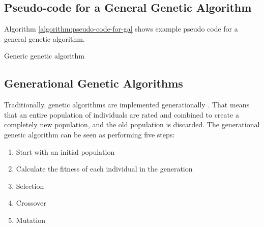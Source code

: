 \subsection{Pseudo-code for a General Genetic Algorithm}

Algorithm \vref{algorithm:pseudo-code-for-ga} shows example pseudo code for a general genetic algorithm.

\begin{algorithm}[H]
\SetAlgoLined
\DontPrintSemicolon
{}
\caption{Generic genetic algorithm}
\label{algorithm:pseudo-code-for-ga}
\end{algorithm}


\subsection{Generational Genetic Algorithms}

Traditionally, genetic algorithms are implemented generationally . That means that an entire population of individuals are rated and combined to create a completely new population, and the old population is discarded. The generational genetic algorithm can be seen as performing five steps:


\begin{enumerate}
    \item Start with an initial population
    \item Calculate the fitness of each individual in the generation
    \item Selection
    \item Crossover
    \item Mutation  
\end{enumerate}

